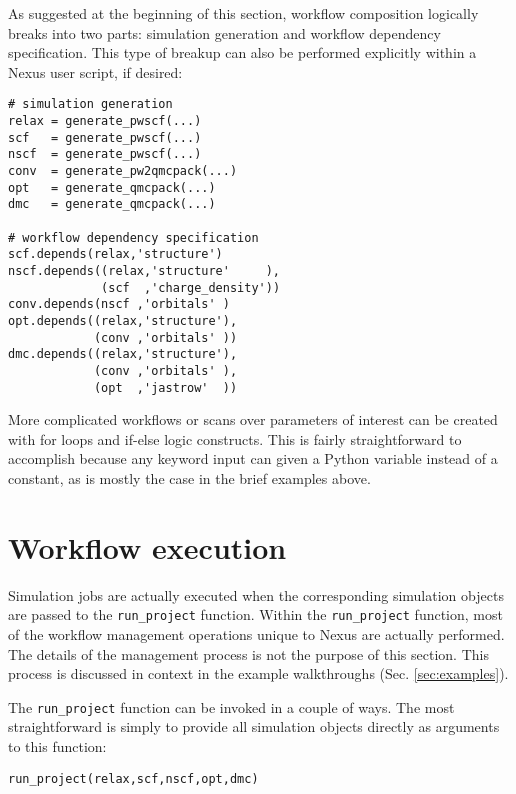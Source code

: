\documentclass[oneside,11pt]{memoir}
\numberwithin{equation}{section}
\begin{document}
\noindent
As suggested at the beginning of this section, workflow composition logically breaks into two parts: simulation generation and workflow dependency specification.  This type of breakup can also be performed explicitly within a Nexus user script, if desired:
\begin{verbatim}
# simulation generation
relax = generate_pwscf(...)
scf   = generate_pwscf(...)
nscf  = generate_pwscf(...)
conv  = generate_pw2qmcpack(...)
opt   = generate_qmcpack(...)
dmc   = generate_qmcpack(...)

# workflow dependency specification
scf.depends(relax,'structure')
nscf.depends((relax,'structure'     ),
             (scf  ,'charge_density'))
conv.depends(nscf ,'orbitals' )
opt.depends((relax,'structure'),
            (conv ,'orbitals' ))
dmc.depends((relax,'structure'),
            (conv ,'orbitals' ),
            (opt  ,'jastrow'  ))
\end{verbatim}

\noindent
More complicated workflows or scans over parameters of interest can be created with for loops and if-else logic constructs.  This is fairly straightforward to accomplish because any keyword input can given a Python variable instead of a constant, as is mostly the case in the brief examples above.



\section{Workflow execution}\label{sec:user_execution}
Simulation jobs are actually executed when the corresponding simulation objects are passed to the \texttt{run\_project} function.  Within the \texttt{run\_project} function, most of the workflow management operations unique to Nexus are actually performed.  The details of the management process is not the purpose of this section.  This process is discussed in context in the example walkthroughs (Sec. \ref{sec:examples}).

The \texttt{run\_project} function can be invoked in a couple of ways.  The most straightforward is simply to provide all simulation objects directly as arguments to this function:
\begin{verbatim}
run_project(relax,scf,nscf,opt,dmc)
\end{verbatim}
\end{document}
